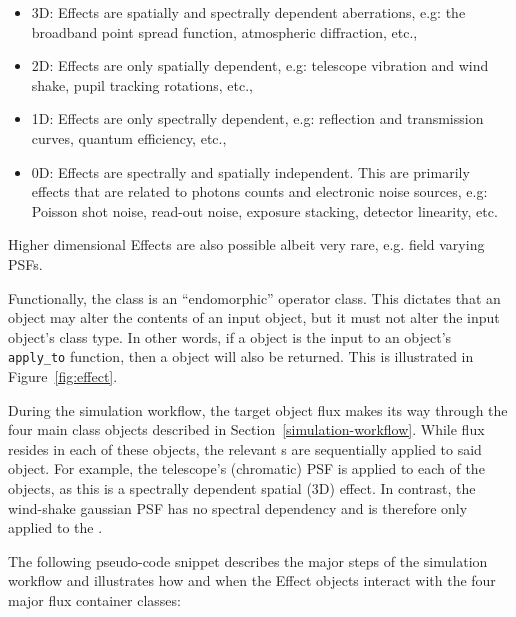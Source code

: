\begin{itemize}
\item 3D: Effects are spatially and spectrally dependent aberrations, e.g: the broadband point spread function, atmospheric diffraction, etc.,

\item 2D: Effects are only spatially dependent, e.g: telescope vibration and wind shake, pupil tracking rotations, etc.,

\item 1D: Effects are only spectrally dependent, e.g: reflection and transmission curves, quantum efficiency, etc.,

\item 0D: Effects are spectrally and spatially independent. This are primarily effects that are related to photons counts and electronic noise sources, e.g:
Poisson shot noise, read-out noise, exposure stacking, detector linearity, etc.
\end{itemize}

Higher dimensional Effects are also possible albeit very rare, e.g. field varying PSFs.

Functionally, the \Effect{} class is an ``endomorphic'' operator class.
This dictates that an \Effect{} object may alter the contents of an input object, but it must not alter the input object's class type.
In other words, if a \Source{} object is the input to an \Effect{} object's \lstinline{apply_to} function, then a \Source{} object will also be returned.
This is illustrated in Figure~\ref{fig:effect}.

During the simulation workflow, the target object flux makes its way through the four main class objects described in Section~\ref{simulation-workflow}.
While flux resides in each of these objects, the relevant \Effect{}s are sequentially applied to said object.
For example, the telescope's (chromatic) PSF is applied to each of the \FieldOfView{} objects, as this is a spectrally dependent spatial (3D) effect.
In contrast, the wind-shake gaussian PSF has no spectral dependency and is therefore only applied to the \ImagePlane{}.

The following pseudo-code snippet describes the major steps of the simulation workflow and illustrates how and when the Effect objects interact with the four major flux container classes:

